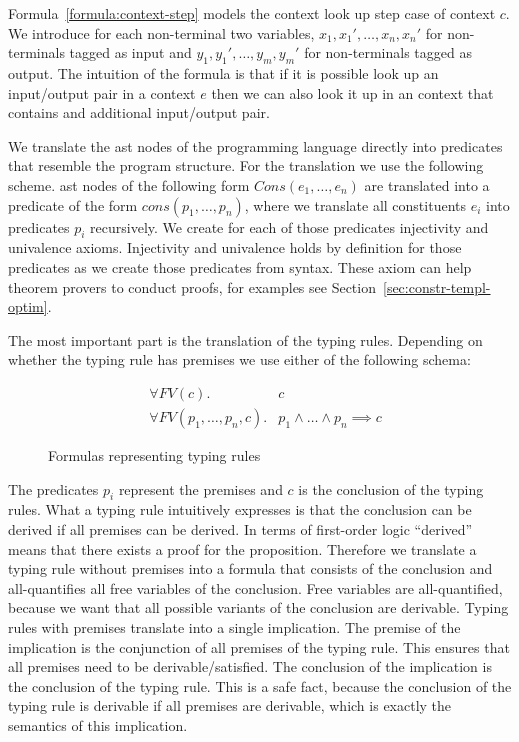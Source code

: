 Formula~\ref{formula:context-step} models the context look up step
case of context $c$. We introduce for each non-terminal two variables,
$x_1,x_1', \dots, x_n,x_n'$ for non-terminals tagged as input and
$y_1,y_1', \dots, y_m,y_m'$ for non-terminals tagged as output. The
intuition of the formula is that if it is possible look up an
input/output pair in a context $e$ then we can also look it up in an
context that contains and additional input/output pair.

We translate the \gls{ast} nodes of the programming language directly
into predicates that resemble the program structure. For the
translation we use the following scheme. \gls{ast} nodes of the
following form $Cons(e_1, \dots, e_n)$ are translated into a predicate
of the form $cons(p_1, \dots, p_n)$, where we translate all
constituents $e_i$ into predicates $p_i$ recursively. We create for
each of those predicates injectivity and univalence
axioms. Injectivity and univalence holds by definition for those
predicates as we create those predicates from syntax. These axiom can
help theorem provers to conduct proofs, for examples see
Section~\ref{sec:constr-templ-optim}.

The most important part is the translation of the typing
rules. Depending on whether the typing rule has premises we use either
of the following schema:

\begin{figure}
\begin{align}
  &\forall FV(c) .& c \\
  &\forall FV(p_1,\dots, p_n, c) .& p_1 \land \dots \land p_n \implies
  c
\label{formula:typing-rule}
\end{align}
\caption{Formulas representing typing rules}
\end{figure}

The predicates $p_i$ represent the premises and $c$ is the conclusion
of the typing rules. What a typing rule intuitively expresses is that
the conclusion can be derived if all premises can be derived. In terms
of first-order logic ``derived'' means that there exists a proof for
the proposition. Therefore we translate a typing rule without premises
into a formula that consists of the conclusion and all-quantifies all
free variables of the conclusion. Free variables are all-quantified,
because we want that all possible variants of the conclusion are
derivable. Typing rules with premises translate into a single
implication. The premise of the implication is the conjunction of all
premises of the typing rule. This ensures that all premises need to be
derivable/satisfied. The conclusion of the implication is the
conclusion of the typing rule. This is a safe fact, because the
conclusion of the typing rule is derivable if all premises are
derivable, which is exactly the semantics of this implication.

